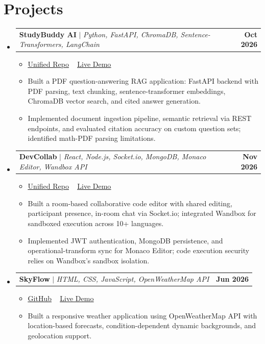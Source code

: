 \documentclass[letterpaper,11pt]{article}
\makeatletter
\newcommand{\resumeItem}[1]{
  \item\small{
    {#1 \vspace{-2pt}}
  }
}
\newcommand{\resumeProjectHeading}[2]{
    \item
    \begin{tabular*}{1.001\textwidth}{l@{\extracolsep{\fill}}r}
      \small#1 & \textbf{\small #2}\\
    \end{tabular*}\vspace{-7pt}
}
\newcommand{\resumeSubHeadingListStart}{\begin{itemize}[leftmargin=0.0in, label={}]}
\newcommand{\resumeSubHeadingListEnd}{\end{itemize}}
\newcommand{\resumeItemListStart}{\begin{itemize}}
\newcommand{\resumeItemListEnd}{\end{itemize}\vspace{-5pt}}
\makeatother
\begin{document}
\section{Projects}
    \vspace{-4pt}
    \resumeSubHeadingListStart
      \resumeProjectHeading
          {\textbf{StudyBuddy AI} $|$ \emph{Python, FastAPI, ChromaDB, Sentence-Transformers, LangChain}}{Oct 2026}
          \resumeItemListStart
            \resumeItem{\href{https://github.com/adityathakur149/StudyBuddy}{\underline{Unified Repo}} ~ \href{https://studybuddy-frontend.vercel.app}{\underline{Live Demo}}}
            \resumeItem{Built a PDF question-answering RAG application: FastAPI backend with PDF parsing, text chunking, sentence-transformer embeddings, ChromaDB vector search, and cited answer generation.}
            \resumeItem{Implemented document ingestion pipeline, semantic retrieval via REST endpoints, and evaluated citation accuracy on custom question sets; identified math-PDF parsing limitations.}
          \resumeItemListEnd
      \resumeProjectHeading
          {\textbf{DevCollab} $|$ \emph{React, Node.js, Socket.io, MongoDB, Monaco Editor, Wandbox API}}{Nov 2026}
          \resumeItemListStart
            \resumeItem{\href{https://github.com/adityathakur149/DevCollab}{\underline{Unified Repo}} ~ \href{https://devcollab-frontend-uwvi.vercel.app}{\underline{Live Demo}}}
            \resumeItem{Built a room-based collaborative code editor with shared editing, participant presence, in-room chat via Socket.io; integrated Wandbox for sandboxed execution across 10+ languages.}
            \resumeItem{Implemented JWT authentication, MongoDB persistence, and operational-transform sync for Monaco Editor; code execution security relies on Wandbox's sandbox isolation.}
          \resumeItemListEnd
      \resumeProjectHeading
          {\textbf{SkyFlow} $|$ \emph{HTML, CSS, JavaScript, OpenWeatherMap API}}{Jun 2026}
          \resumeItemListStart
            \resumeItem{\href{https://github.com/adityathakur149/SkyFlow}{\underline{GitHub}} ~ \href{https://skyflow.vercel.app}{\underline{Live Demo}}}
            \resumeItem{Built a responsive weather application using OpenWeatherMap API with location-based forecasts, condition-dependent dynamic backgrounds, and geolocation support.}
          \resumeItemListEnd
    \resumeSubHeadingListEnd
  \vspace{4pt}
\end{document}
